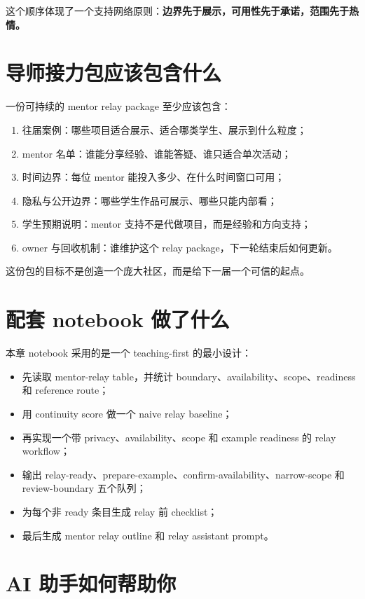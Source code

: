 这个顺序体现了一个支持网络原则：\textbf{边界先于展示，可用性先于承诺，范围先于热情。}

\section{导师接力包应该包含什么}

一份可持续的 mentor relay package 至少应该包含：

\begin{enumerate}
    \item 往届案例：哪些项目适合展示、适合哪类学生、展示到什么粒度；
    \item mentor 名单：谁能分享经验、谁能答疑、谁只适合单次活动；
    \item 时间边界：每位 mentor 能投入多少、在什么时间窗口可用；
    \item 隐私与公开边界：哪些学生作品可展示、哪些只能内部看；
    \item 学生预期说明：mentor 支持不是代做项目，而是经验和方向支持；
    \item owner 与回收机制：谁维护这个 relay package，下一轮结束后如何更新。
\end{enumerate}

这份包的目标不是创造一个庞大社区，而是给下一届一个可信的起点。

\section{配套 notebook 做了什么}

本章 notebook 采用的是一个 teaching-first 的最小设计：

\begin{itemize}
    \item 先读取 mentor-relay table，并统计 boundary、availability、scope、readiness 和 reference route；
    \item 用 continuity score 做一个 naive relay baseline；
    \item 再实现一个带 privacy、availability、scope 和 example readiness 的 relay workflow；
    \item 输出 relay-ready、prepare-example、confirm-availability、narrow-scope 和 review-boundary 五个队列；
    \item 为每个非 ready 条目生成 relay 前 checklist；
    \item 最后生成 mentor relay outline 和 relay assistant prompt。
\end{itemize}

\section{AI 助手如何帮助你}

